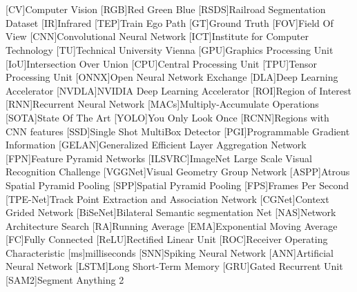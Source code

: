 {}
\chapter*{\listacroname}
\begin{acronym}[XXXXX]
    [CV]{Computer Vision}
    [RGB]{Red Green Blue}
    [RSDS]{Railroad Segmentation Dataset}
    [IR]{Infrared}
    [TEP]{Train Ego Path}
    [GT]{Ground Truth}
    [FOV]{Field Of View}
    [CNN]{Convolutional Neural Network}
    [ICT]{Institute for Computer Technology}
    [TU]{Technical University Vienna}
    [GPU]{Graphics Processing Unit}
    [IoU]{Intersection Over Union}
    [CPU]{Central Processing Unit}
    [TPU]{Tensor Processing Unit}
    [ONNX]{Open Neural Network Exchange}
    [DLA]{Deep Learning Accelerator}
    [NVDLA]{NVIDIA Deep Learning Accelerator}
    [ROI]{Region of Interest}
    [RNN]{Recurrent Neural Network}
    [MACs]{Multiply-Accumulate Operations}
    [SOTA]{State Of The Art}
    [YOLO]{You Only Look Once}
    [RCNN]{Regions with CNN features}
    [SSD]{Single Shot MultiBox Detector}
    [PGI]{Programmable Gradient Information}
    [GELAN]{Generalized Efficient Layer Aggregation Network}
    [FPN]{Feature Pyramid Networks}
    [ILSVRC]{ImageNet Large Scale Visual Recognition Challenge}
    [VGGNet]{Visual Geometry Group Network}
    [ASPP]{Atrous Spatial Pyramid Pooling}
    [SPP]{Spatial Pyramid Pooling}
    [FPS]{Frames Per Second}
    [TPE-Net]{Track Point Extraction and Association Network}
    [CGNet]{Context Grided Network}
    [BiSeNet]{Bilateral Semantic segmentation Net}
    [NAS]{Network Architecture Search}
    [RA]{Running Average}
    [EMA]{Exponential Moving Average}
    [FC]{Fully Connected}
    [ReLU]{Rectified Linear Unit}
    [ROC]{Receiver Operating Characteristic}
    [ms]{milliseconds}
    [SNN]{Spiking Neural Network}
    [ANN]{Artificial Neural Network}
    [LSTM]{Long Short-Term Memory}
    [GRU]{Gated Recurrent Unit}
    [SAM2]{Segment Anything 2}
\end{acronym}